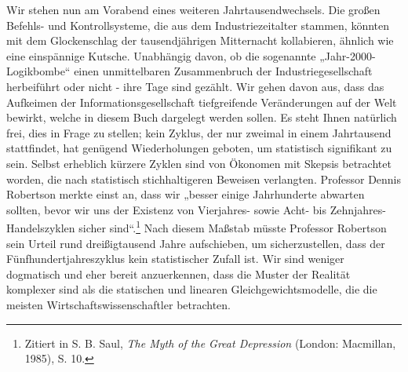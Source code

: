 \documentclass[
  a5paper,
  smalldemyvopaper,10pt,twoside,onecolumn,openright,extrafontsizes,hidelinks]{memoir}
\begin{document}
Wir stehen nun am Vorabend eines weiteren Jahrtausendwechsels. Die
großen Befehls- und Kontrollsysteme, die aus dem Industriezeitalter
stammen, könnten mit dem Glockenschlag der tausendjährigen Mitternacht
kollabieren, ähnlich wie eine einspännige Kutsche. Unabhängig davon, ob
die sogenannte „Jahr-2000-Logikbombe`` einen unmittelbaren Zusammenbruch
der Industriegesellschaft herbeiführt oder nicht - ihre Tage sind
gezählt. Wir gehen davon aus, dass das Aufkeimen der
Informationsgesellschaft tiefgreifende Veränderungen auf der Welt
bewirkt, welche in diesem Buch dargelegt werden sollen. Es steht Ihnen
natürlich frei, dies in Frage zu stellen; kein Zyklus, der nur zweimal
in einem Jahrtausend stattfindet, hat genügend Wiederholungen geboten,
um statistisch signifikant zu sein. Selbst erheblich kürzere Zyklen sind
von Ökonomen mit Skepsis betrachtet worden, die nach statistisch
stichhaltigeren Beweisen verlangten. Professor Dennis Robertson merkte
einst an, dass wir „besser einige Jahrhunderte abwarten sollten, bevor
wir uns der Existenz von Vierjahres- sowie Acht- bis
Zehnjahres-Handelszyklen sicher sind``.\footnote{Zitiert in S. B. Saul,
  \emph{The Myth of the Great Depression} (London: Macmillan, 1985), S.
  10.} Nach diesem Maßstab müsste Professor Robertson sein Urteil rund
dreißigtausend Jahre aufschieben, um sicherzustellen, dass der
Fünfhundertjahreszyklus kein statistischer Zufall ist. Wir sind weniger
dogmatisch und eher bereit anzuerkennen, dass die Muster der Realität
komplexer sind als die statischen und linearen Gleichgewichtsmodelle,
die die meisten Wirtschaftswissenschaftler betrachten.
\end{document}
